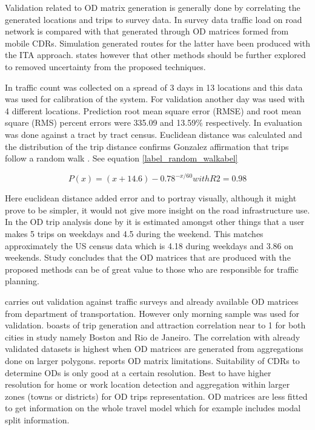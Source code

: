 \documentclass[12pt, a4paper]{report}
\theoremstyle{definition}
\theoremstyle{definition}%
\theoremstyle{definition}%
\theoremstyle{definition}%
\theoremstyle{definition}%
\theoremstyle{definition}%
\begin{document}
Validation related to OD matrix generation is generally done by correlating the generated locations and trips to survey data. In \cite{Toole2015} survey data traffic load on road network is compared with that generated through OD matrices formed from mobile CDRs. Simulation generated routes for the latter have been produced with the ITA approach. \cite{Toole2015} states however that other methods should be further explored to removed uncertainty from the proposed techniques.

In \cite{Iqbal2014} traffic count was collected on a spread of 3 days in 13 locations and this data was used for calibration of the system.  For validation another day was used with 4 different locations. Prediction root mean square error (RMSE) and root mean square (RMS) percent errors were 335.09 and 13.59\% respectively. In \cite{Calabrese2011} evaluation was done against a tract by tract census. Euclidean distance was calculated and the distribution of the trip distance confirms Gonzalez affirmation that trips follow a random walk \cite{Gonzalez2008}. See equation \ref{label_random_walkabel}

\begin{equation}\label{label_random_walk}
P(x) = (x+14.6)-0.78^{-x/60} with R2 = 0.98  
\end{equation}

Here euclidean distance added error and to portray visually, although it might prove to be simpler, it would not give more insight on the road infrastructure use. In the OD trip analysis done by \cite{Calabrese2011} it is estimated amongst other things that a user makes 5 trips on weekdays and 4.5 during the weekend. This matches approximately the US census data which is 4.18 during weekdays and 3.86 on weekends. Study concludes that the OD matrices that are produced with the proposed methods can be of great value to those who are responsible for traffic planning.

\cite{Colak2015} carries out validation against traffic surveys and already available OD matrices from department of transportation.  However only morning sample was used for validation. \cite{Colak2015} boasts of trip generation and attraction correlation near to 1 for both cities in study namely Boston and Rio de Janeiro. The correlation with already validated datasets is highest when OD matrices are generated from aggregations done on larger polygons. \cite{Colak2015} reports OD matrix limitations. Suitability of CDRs to determine ODs is only good at a certain resolution. Best to have higher resolution for home or work location detection and aggregation within larger zones (towns or districts) for OD trips representation. OD matrices are less fitted to get information on the whole travel model which for example includes modal split information.
\end{document}
